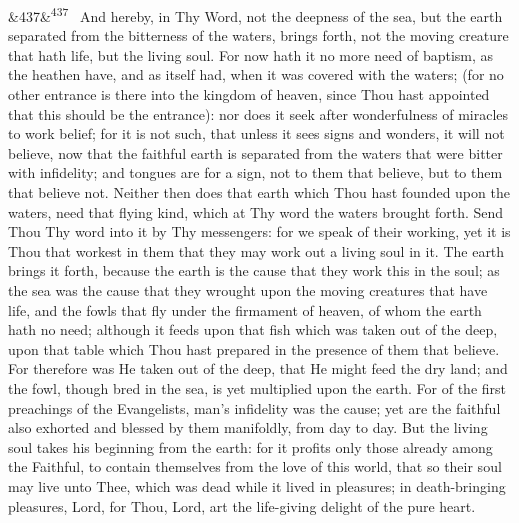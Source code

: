\documentclass[12pt]{article}
\newcommand{\para}[1][]{\par\noindent\ifx&#1&\else\textsuperscript{\footnotesize #1}~\fi}
\begin{document}
\para[437] And hereby, in Thy Word, not the deepness of the sea, but the earth separated from the bitterness of the waters, brings forth, not the moving creature that hath life, but the living soul. For now hath it no more need of baptism, as the heathen have, and as itself had, when it was covered with the waters; (for no other entrance is there into the kingdom of heaven, since Thou hast appointed that this should be the entrance): nor does it seek after wonderfulness of miracles to work belief; for it is not such, that unless it sees signs and wonders, it will not believe, now that the faithful earth is separated from the waters that were bitter with infidelity; and tongues are for a sign, not to them that believe, but to them that believe not. Neither then does that earth which Thou hast founded upon the waters, need that flying kind, which at Thy word the waters brought forth. Send Thou Thy word into it by Thy messengers: for we speak of their working, yet it is Thou that workest in them that they may work out a living soul in it. The earth brings it forth, because the earth is the cause that they work this in the soul; as the sea was the cause that they wrought upon the moving creatures that have life, and the fowls that fly under the firmament of heaven, of whom the earth hath no need; although it feeds upon that fish which was taken out of the deep, upon that table which Thou hast prepared in the presence of them that believe. For therefore was He taken out of the deep, that He might feed the dry land; and the fowl, though bred in the sea, is yet multiplied upon the earth. For of the first preachings of the Evangelists, man's infidelity was the cause; yet are the faithful also exhorted and blessed by them manifoldly, from day to day. But the living soul takes his beginning from the earth: for it profits only those already among the Faithful, to contain themselves from the love of this world, that so their soul may live unto Thee, which was dead while it lived in pleasures; in death-bringing pleasures, Lord, for Thou, Lord, art the life-giving delight of the pure heart.
\end{document}
